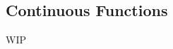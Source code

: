 \documentclass[../poma-notes.tex]{subfiles}
\begin{document}
\subsection*{Continuous Functions}

WIP
\end{document}
